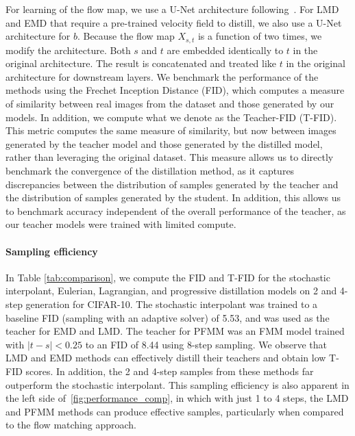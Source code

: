For learning of the flow map, we use a U-Net architecture following~\citep{dhariwal_diffusion_2021}. For LMD and EMD that require a pre-trained velocity field to distill, we also use a U-Net architecture for $b$.
%
Because the flow map $X_{s, t}$ is a function of two times, we modify the architecture.
%
Both $s$ and $t$ are embedded identically to $t$ in the original architecture.
%
The result is concatenated and treated like $t$ in the original architecture for downstream layers.
%
We benchmark the performance of the methods using the Frechet Inception Distance (FID), which computes a measure of similarity between real images from the dataset and those generated by our models.
%
In addition, we compute what we denote as the Teacher-FID (T-FID).
%
This metric computes the same measure of similarity, but now between images generated by the teacher model and those generated by the distilled model, rather than leveraging the original dataset.
%
This measure allows us to directly benchmark the convergence of the distillation method, as it captures discrepancies between the distribution of samples generated by the teacher and the distribution of samples generated by the student.
%
In addition, this allows us to benchmark accuracy independent of the overall performance of the teacher, as our teacher models were trained with limited compute.


\paragraph{Sampling efficiency}
%
In Table \ref{tab:comparison}, we compute the FID and T-FID for the stochastic interpolant, Eulerian, Lagrangian, and progressive distillation models on 2 and 4-step generation for CIFAR-10.
%
The stochastic interpolant was trained to a baseline FID (sampling with an adaptive solver) of 5.53, and was used as the teacher for EMD and LMD.
%
The teacher for PFMM was an FMM model trained with $|t-s| < 0.25$ to an FID of 8.44 using 8-step sampling. We observe that LMD and EMD methods can effectively distill their teachers and obtain low T-FID scores.
%
In addition, the 2 and 4-step samples from these methods far outperform the stochastic interpolant. This sampling efficiency is also apparent in the left side of~\cref{fig:performance_comp}, in which with just 1 to 4 steps, the LMD and PFMM methods can produce effective samples, particularly when compared to the flow matching approach.

